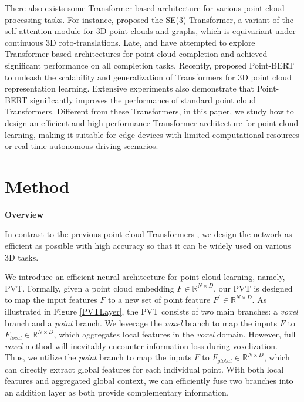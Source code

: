 \documentclass[10pt,twocolumn,letterpaper]{article}
\begin{document}
There also exists some Transformer-based architecture for various point cloud processing tasks. For instance, \cite{se3} proposed the SE(3)-Transformer, a variant of the self-attention module for 3D point clouds and graphs, which is equivariant under continuous 3D roto-translations. Late, \cite{pointtr} and \cite{snow} have attempted to explore Transformer-based architectures for point cloud completion and achieved significant performance on all completion tasks. Recently, \cite{point-bert} proposed Point-BERT to unleash the scalability and generalization of Transformers for 3D point cloud representation learning. Extensive experiments also demonstrate that Point-BERT significantly improves the performance of standard point cloud Transformers. Different from these Transformers, in this paper, we study how to design an efficient and high-performance Transformer architecture for point cloud learning, making it suitable for edge devices with limited computational resources or real-time autonomous driving scenarios.
\section{Method}

\noindent \textbf{Overview}

In contrast to the previous point cloud Transformers \cite{guo2020pct,Nico,zhao2020point}, we design the network as efficient as possible with high accuracy so that it can be widely used on various 3D tasks.

We introduce an efficient neural architecture for point cloud learning, namely, PVT. Formally, given a point cloud embedding $F \in \mathbb{R}^{N\times D}$, our PVT is designed to map the input features $F$ to a new set of point feature $F^{\prime} \in \mathbb{R}^{N\times D}$. As illustrated in Figure \ref{PVTLayer}, the PVT consists of two main branches: a \emph{voxel} branch and a \emph{point} branch. We leverage the \emph{voxel} branch to map the inputs $F$ to $F_{local}\in \mathbb{R}^{N\times D}$, which aggregates local features in the \emph{voxel} domain. However, full \emph{voxel} method will inevitably encounter information loss during voxelization. Thus, we utilize the \emph{point} branch to map the inputs $F$ to $F_{global}\in \mathbb{R}^{N\times D}$, which can directly extract global features for each individual point. With both local features and aggregated global context, we can efficiently fuse two branches into an addition layer as both provide complementary information.
\end{document}
